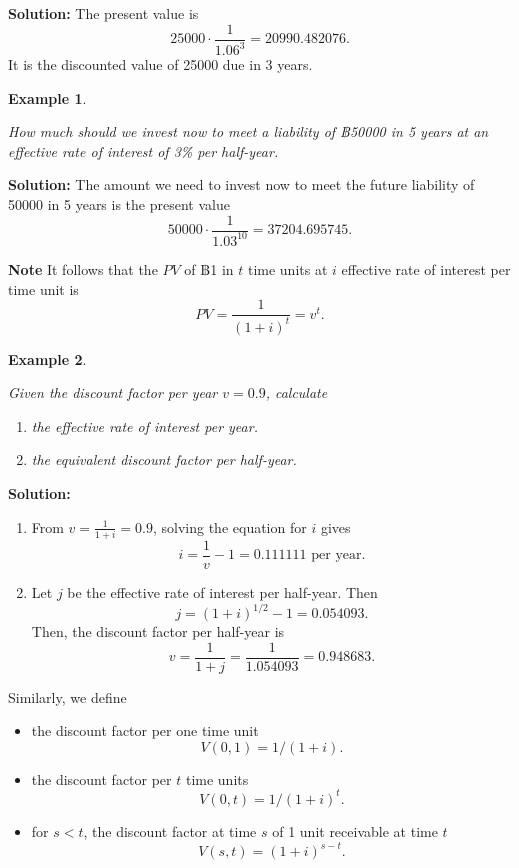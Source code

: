 \documentclass[landscape, 20pt]{extreport}
\theoremstyle{definition}
\theoremstyle{definition}
\newtheorem{example}{Example}[chapter]
\theoremstyle{definition}
\theoremstyle{definition}
\theoremstyle{remark}
\begin{document}
\textbf{Solution:} The present value is
\[25000 \cdot \frac{1}{1.06^3} = 20990.482076.\] It is the discounted
value of 25000 due in 3 years.

\newpage \begin{example}
\protect\hypertarget{exm:unlabeled-div-15}{}\label{exm:unlabeled-div-15}

\emph{How much should we invest now to meet a liability of
฿50000 in 5 years at an effective rate of interest of 3\% per half-year.}

\end{example}

\textbf{Solution:} The amount we need to invest now to meet the future
liability of 50000 in 5 years is the present value
\[50000 \cdot \frac{1}{1.03^{10}} = 37204.695745.\]

\textbf{Note} It follows that the \(PV\) of ฿1 in \(t\) time units at \(i\)
effective rate of interest per time unit is
\[PV = \frac{1}{(1+i)^t} = v^t.\]

\newpage \begin{example}
\protect\hypertarget{exm:unlabeled-div-16}{}\label{exm:unlabeled-div-16}

\emph{Given the discount factor per year \(v = 0.9\),
calculate}

\begin{enumerate}
\def\labelenumi{\arabic{enumi}.}
\item
  \emph{the effective rate of interest per year.}
\item
  \emph{the equivalent discount factor per half-year.}
\end{enumerate}

\end{example}

\textbf{Solution:}

\begin{enumerate}
\def\labelenumi{\arabic{enumi}.}
\item
  From \(\displaystyle{ v= \frac{1}{1+i} = 0.9}\), solving the equation
  for \(i\) gives \[i = \frac{1}{v} - 1 = 0.111111 \text{ per year}.\]
\item
  Let \(j\) be the effective rate of interest per half-year. Then
  \[j = (1+ i)^{1/2} -1 = 0.054093.\] Then, the discount factor per
  half-year is \[v = \frac{1}{1+j} = \frac{1}{1.054093} = 0.948683.\]
\end{enumerate}

Similarly, we define

\begin{itemize}
\item
  the discount factor per one time unit \[V(0,1) = 1/(1 + i).\]
\item
  the discount factor per \(t\) time units \[V(0,t) = 1/(1 + i)^t.\]
\item
  for \(s < t\), the discount factor at time \(s\) of 1 unit receivable at
  time \(t\) \[V(s,t) =  (1 + i)^{s - t}.\]
\end{itemize}
\end{document}
